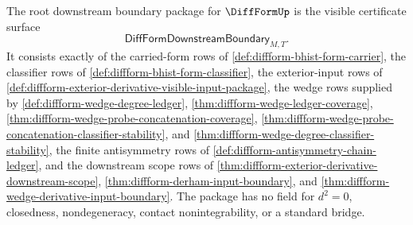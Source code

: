\begin{definition}
\label{def:diffform-root-downstream-boundary-package}
The root downstream boundary package for $\DiffFormUp$ is the visible
certificate surface
$$
\mathsf{DiffFormDownstreamBoundary}_{M,T}.
$$
It consists exactly of the carried-form rows of
\autoref{def:diffform-bhist-form-carrier}, the classifier rows of
\autoref{def:diffform-bhist-form-classifier}, the exterior-input rows of
\autoref{def:diffform-exterior-derivative-visible-input-package}, the wedge
rows supplied by \autoref{def:diffform-wedge-degree-ledger},
\autoref{thm:diffform-wedge-ledger-coverage},
\autoref{thm:diffform-wedge-probe-concatenation-coverage},
\autoref{thm:diffform-wedge-probe-concatenation-classifier-stability}, and
\autoref{thm:diffform-wedge-degree-classifier-stability}, the finite
antisymmetry rows of \autoref{def:diffform-antisymmetry-chain-ledger}, and the
downstream scope rows of
\autoref{thm:diffform-exterior-derivative-downstream-scope},
\autoref{thm:diffform-derham-input-boundary}, and
\autoref{thm:diffform-wedge-derivative-input-boundary}. The package has no
field for $d^2=0$, closedness, nondegeneracy, contact nonintegrability, or a
standard bridge.
\end{definition}

